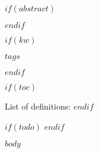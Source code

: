 \documentclass[a4paper,11pt,oneside,oldfontcommands]{memoir}
\subtitle{$subtitle$}
\date{\today}
\theoremstyle{definition}
\theoremstyle{break}		%
\numberwithin{equation}{chapter}
\numberwithin{figure}{chapter}
\begin{document}


$if(abstract)$
\begin{abstract}
$abstract$
\end{abstract}
$endif$


$if(kw)$		%
\begin{keywords}
$tags$
\end{keywords}
$endif$


%
$if(toc)$		%
\tableofcontents
\pagebreak

List of definitions:
$endif$

$if(todo)$		%
\listoftodos
\pagebreak
$endif$


$body$



\printindex

\end{document}

